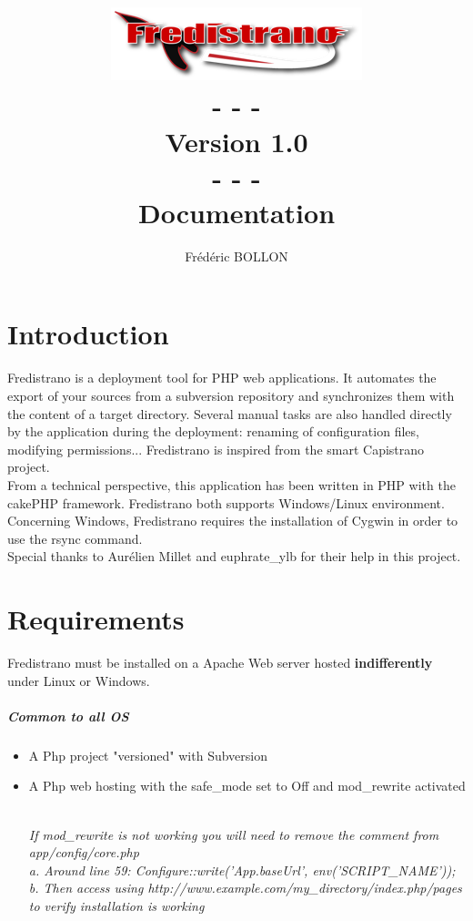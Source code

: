 \documentclass[12pt,a4paper]{report}
\author{Frédéric BOLLON}
\title{\includegraphics{doc_fredistrano2.png}\\- - -\\Version 1.0\\- - -\\Documentation\\}
\begin{document}
\maketitle
\tableofcontents

\chapter{Introduction}
Fredistrano is a deployment tool for PHP web applications. It automates the export of your sources from a subversion repository and synchronizes them with the content of a target directory. Several manual tasks are also handled directly by the application during the deployment: renaming of configuration files, modifying permissions... Fredistrano is inspired from the smart Capistrano project.\\

From a technical perspective, this application has been written in PHP with the cakePHP framework. Fredistrano both supports Windows/Linux environment. Concerning Windows, Fredistrano requires the installation of Cygwin in order to use the rsync command.\\

Special thanks to Aurélien Millet and euphrate\_ylb for their help in this project.

\chapter{Requirements}
Fredistrano must be installed on a Apache Web server hosted \textbf{indifferently} under Linux or Windows.
\paragraph*{Common to all OS}
\begin{itemize}
\item 
A Php project "versioned" with Subversion
\item 
A Php web hosting with the safe\_mode set to Off and mod\_rewrite activated\\\\
\begin{small}\textit{If mod\_rewrite is not working you will need to remove the comment from app/config/core.php\\
      a. Around line 59: Configure::write('App.baseUrl', env('SCRIPT\_NAME'));\\
      b. Then access using http://www.example.com/my\_directory/index.php/pages to verify installation is working}\end{small}
\end{itemize}
\end{document}
